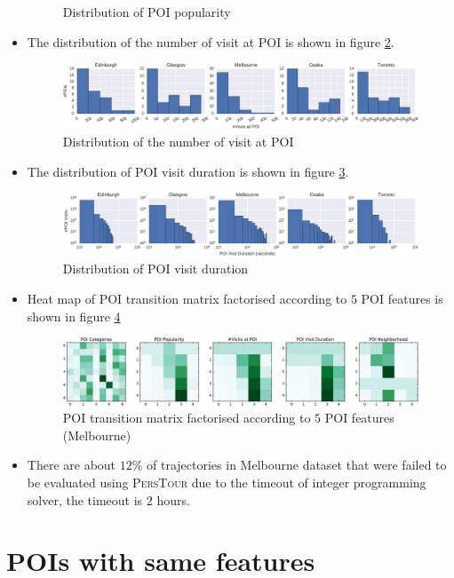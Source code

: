 \begin{itemize}
\begin{figure}
      \caption{Distribution of POI popularity}
      \label{fig:popularity}
      \end{figure}
\item The distribution of the number of visit at POI is shown in figure \ref{fig:nvisit}.
      \begin{figure}
      \includegraphics[width=\textwidth]{fig/poi_nvisit.pdf}
      \caption{Distribution of the number of visit at POI}
      \label{fig:nvisit}
      \end{figure}
\item The distribution of POI visit duration is shown in figure \ref{fig:duration}.
      \begin{figure}
      \includegraphics[width=\textwidth]{fig/visit_duration.pdf}
      \caption{Distribution of POI visit duration}
      \label{fig:duration}
      \end{figure}
\item Heat map of POI transition matrix factorised according to $5$ POI features is shown in figure \ref{fig:transmat}
      \begin{figure}
      \includegraphics[width=\textwidth]{fig/poi_transmat.pdf}
      \caption{POI transition matrix factorised according to $5$ POI features (Melbourne)}
      \label{fig:transmat}
      \end{figure}
\item There are about $12$\% of trajectories in Melbourne dataset that were failed to be evaluated
      using \textsc{PersTour} due to the timeout of integer programming solver, the timeout is $2$ hours.
\end{itemize}


\section{POIs with same features}


